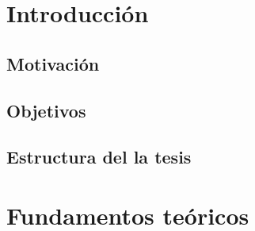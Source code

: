 \documentclass[a4paper,12pt]{report}
\theoremstyle{definition}
\theoremstyle{plain}
\theoremstyle{remark}
\begin{document}
\cleardoublepage
{}

\chapter{Introducci\'on}
    \section{Motivaci\'on}
    \section{Objetivos}
    \section{Estructura del la tesis}

\chapter{Fundamentos te\'oricos}
\end{document}
